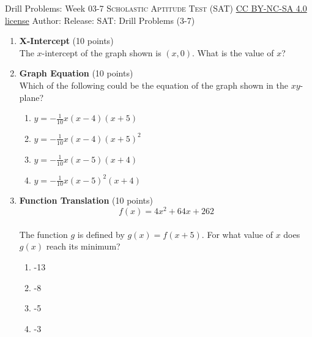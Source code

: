 \newpage\handout
{Drill Problems: Week 03-7}
{\textsc{Scholastic Aptitude Test (SAT)}}
{\href{https://creativecommons.org/licenses/by-nc-sa/4.0/}{CC BY-NC-SA 4.0 license}}
{Author: \BookAuthor}{Release: \generatedOn}
{SAT: Drill Problems (3-7)}


\begin{enumerate}
  \item \textbf{X-Intercept} (10 points)\\
  The $x$-intercept of the graph shown is $(x, 0)$. What is the value of $x$?
  \begin{subanswer}
  \end{subanswer}
  

  \newpage


  \item \textbf{Graph Equation} (10 points)\\
  Which of the following could be the equation of the graph shown in the $xy$-plane?
  \begin{enumerate}[label=(\Alph*)]
    \item $y=-\frac{1}{10} x(x-4)(x+5)$
    \item $y=-\frac{1}{10} x(x-4)(x+5)^{2}$
    \item $y=-\frac{1}{10} x(x-5)(x+4)$
    \item $y=-\frac{1}{10} x (x-5)^{2}(x+4)$
  \end{enumerate}
  \begin{subanswer}
  \end{subanswer}


  \item \textbf{Function Translation} (10 points)\\
  $$f(x)=4 x^{2}+64 x+262$$\\
  The function $g$ is defined by $g(x)=f(x+5)$. For what value of $x$ does $g(x)$ reach its minimum?
  \begin{enumerate}[label=(\Alph*)]
    \item -13
    \item -8
    \item -5
    \item -3
  \end{enumerate}
  \begin{subanswer}
  \end{subanswer}



\end{enumerate}
